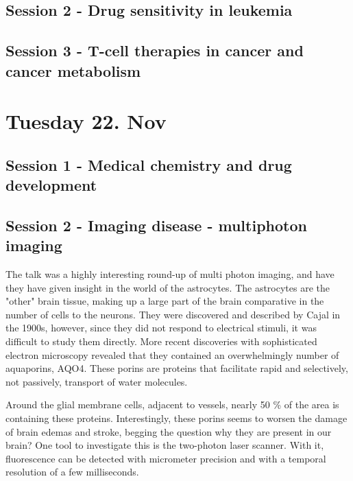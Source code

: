 \documentclass[12p]{article}
\begin{document}
\subsection*{Session 2 - Drug sensitivity in leukemia}

\subsection*{Session 3 - T-cell therapies in cancer and cancer metabolism}

\section*{Tuesday 22. Nov}
\subsection*{Session 1 - Medical chemistry and drug development}

\subsection*{Session 2 - Imaging disease - multiphoton imaging}

The talk was a highly interesting round-up of multi photon imaging, and have they have given insight in the world of the astrocytes.
The astrocytes are the "other" brain tissue, making up a large part of the brain comparative in the number of cells to the neurons.
They were discovered and described by Cajal in the 1900s, however, since they did not respond to electrical stimuli, it was difficult to study them directly.
More recent discoveries with sophisticated electron microscopy revealed that they contained an overwhelmingly number of aquaporins, AQO4.
These porins are proteins that facilitate rapid and selectively, not passively, transport of water molecules.

Around the glial membrane cells, adjacent to vessels, nearly 50 \% of the area is containing these proteins.
Interestingly, these porins seems to worsen the damage of brain edemas and stroke, begging the question why they are present in our brain?
One tool to investigate this is the two-photon laser scanner.
With it, fluorescence can be detected with micrometer precision and with a temporal resolution of a few milliseconds.
\end{document}

